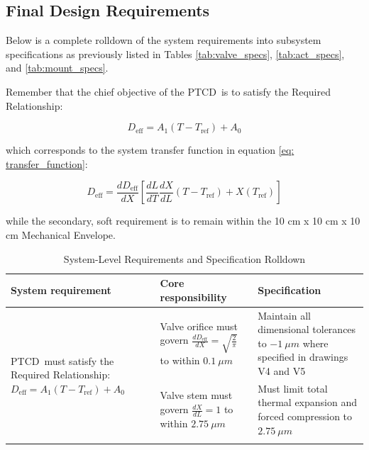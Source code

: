 \documentclass[12pt, letterpaper]{report}%
\newcounter{mycounter}           %
\newcounter{sub}[mycounter]      %
\newcommand{\device}{PTCD}
\newcommand{\dDdXTol}{$0.1\ \mu m$}
\newcommand{\dXdLTol}{$2.75\ \mu m$}
\begin{document}
\newpage
\begin{appendices}

\chapter{Final Design Requirements}
\label{app:requirements}

    Below is a complete rolldown of the system requirements into subsystem specifications
    as previously listed in Tables \ref{tab:valve_specs}, \ref{tab:act_specs}, and \ref{tab:mount_specs}.

    Remember that the chief objective of the \device\ is to satisfy the Required Relationship:

        $$D_{\text{eff}} = A_1(T - T_{\text{ref}}) + A_0$$

    which corresponds to the system transfer function in equation \ref{eq: transfer_function}:

        $$D_{\text{eff}}=\frac{dD_{\text{eff}}}{dX} \left[\frac{dL}{dT}\frac{dX}{dL}(T-T_{\text{ref}})+X\left(T_{\text{ref}} \right) \right]$$

    while the secondary, soft requirement is to remain within the 10 cm x 10 cm x 10 cm Mechanical Envelope.


\newpage
\enlargethispage{4cm}
\begin{table}[H]
    \centering
    \caption{System-Level Requirements and Specification Rolldown}
    \label{tab:system_specs}
    \renewcommand{\arraystretch}{1.4}
    \begin{tabular}{|m{}|m{}|m{}|}

        \hline
        \textbf{System requirement}
            &
        \textbf{Core responsibility}
            &
        \textbf{Specification} \\

        \hline

        \multirow[c]{9}{0.2\textwidth}{%
            \device\ must satisfy the Required Relationship:
            $D_{\text{eff}} = A_1(T - T_{\text{ref}}) + A_0$
        }
            &
        Valve orifice must govern $\frac{dD_{\text{eff}}}{dX} = \sqrt{\frac{2}{\pi}}$ to within \dDdXTol\
            &
        Maintain all dimensional tolerances to $-1\ \mu m$ where specified in drawings V4 and V5
        \\ \cline{2-3}

            &
        Valve stem must govern $\frac{dX}{dL} = 1$ to within \dXdLTol\
            &
        Must limit total thermal expansion and forced compression to \dXdLTol
        \\ \cline{2-3}


\end{tabular}
\end{table}
\end{appendices}
\end{document}
